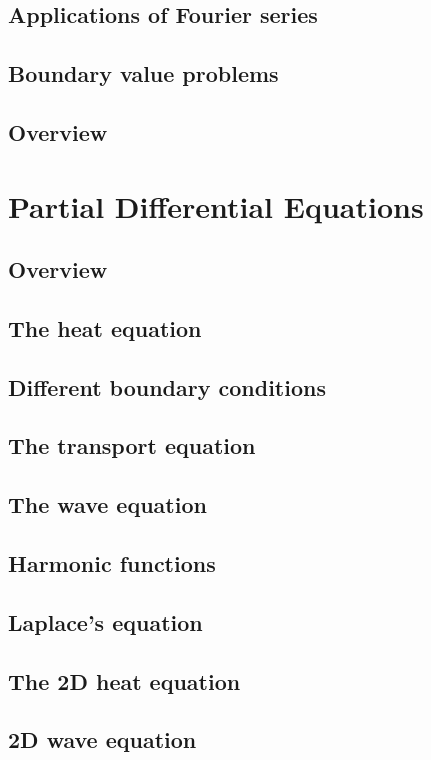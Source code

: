 \documentclass{article}
\begin{document}
\subsection{Applications of Fourier series}
\subsection{Boundary value problems}

\subsection*{Overview}

\pagebreak
\section{Partial Differential Equations}
\subsection*{Overview}

\subsection{The heat equation}
\subsection{Different boundary conditions}
\subsection{The transport equation}
\subsection{The wave equation}
\subsection{Harmonic functions}
\subsection{Laplace's equation}
\subsection{The 2D heat equation}
\subsection{2D wave equation}
\end{document}
